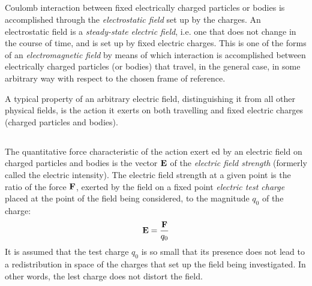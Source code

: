 \subsection{}\label{15.1.2} Coulomb interaction  between fixed electrically charged particles or bodies is accomplished through the \emph{electrostatic field} set up by the charges. An electrostatic field is a \emph{steady-state electric field}, i.e. one that does not change in the course of time, and is set up by fixed electric charges. This is one of the forms of an \emph{electromagnetic field} by means of which interaction is accomplished between electrically charged particles (or bodies) that travel, in the general case, in some arbitrary way with respect to the chosen frame of reference.

A typical property of an arbitrary electric field, distinguishing it from all other physical fields, is the action it exerts on both travelling and fixed electric charges (charged particles and bodies).

\subsection{}\label{15.1.3} The quantitative force characteristic of the action exert­ ed by an electric field on charged particles and bodies is the vector $\vb{E}$ of the \emph{electric field strength} (formerly called the electric intensity). The electric field strength at a given point is the ratio of the force $\vb{F}$, exerted by the field on a fixed point  \emph{electric test charge} placed at the point of the field being considered, to the magnitude $q_{0}$ of the charge:
\begin{equation*}%
\vb{E} = \frac{\vb{F}}{q_{0}}
\end{equation*}
It is assumed that the test charge $q_{0}$ is so small that its presence does not lead to a redistribution in space of the charges that set up the field being investigated. In other words, the lest charge does not distort the field.

